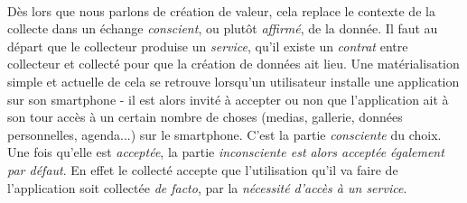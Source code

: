 \paragraph{} Dès lors que nous parlons de création de valeur, cela replace le contexte de la collecte dans un échange
\emph{conscient}, ou plutôt \emph{affirmé}, de la donnée. Il faut au départ que le collecteur produise un \emph{service},
qu'il existe un \emph{contrat} entre collecteur et collecté pour que la création de données ait lieu. Une matérialisation
simple et actuelle de cela se retrouve lorsqu'un utilisateur installe une application sur son smartphone - il est
alors invité à accepter ou non que l'application ait à son tour accès à un certain nombre de choses (medias, gallerie,
données personnelles, agenda...) sur le smartphone. C'est la partie \emph{consciente} du choix. Une fois qu'elle est
\emph{acceptée}, la partie \emph{inconsciente est alors acceptée également par défaut}. En effet le collecté accepte que
l'utilisation qu'il va faire de l'application soit collectée \emph{de facto}, par la \emph{nécessité d'accès à un service}.
